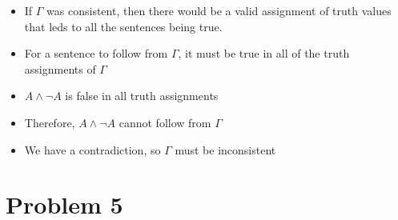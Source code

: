 \documentclass[12pt]{article}
\begin{document}
\begin{itemize}
    \item If $\Gamma$ was consistent, then there would be a valid assignment of truth values that leds to all the sentences being true. 
    \item For a sentence to follow from $\Gamma$, it must be true in all of the truth assignments of $\Gamma$
    \item $A \land \lnot A$ is false in all truth assignments
    \item Therefore, $A \land \lnot A$ cannot follow from $\Gamma$
    \item We have a contradiction, so $\Gamma$ must be inconsistent
\end{itemize}

\section*{Problem 5}
\end{document}
